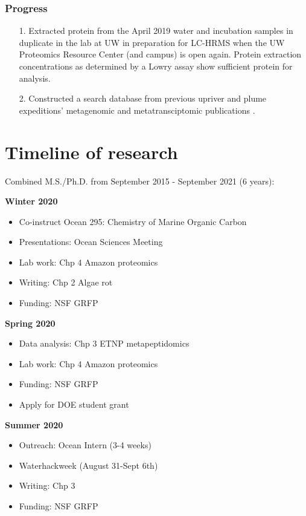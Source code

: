 \documentclass[12pt, letterpaper, twoside]{article}
\begin{document}
\subsubsection*{Progress}


\begin{enumerate}
	\item[1.] Extracted protein from the April 2019 water and incubation samples in duplicate in the lab at UW in preparation for LC-HRMS when the UW Proteomics Resource Center (and campus) is open again. Protein extraction concentrations as determined by a Lowry assay show sufficient protein for analysis. 
	\item[2.] Constructed a search database from previous upriver and plume expeditions' metagenomic and metatransciptomic publications \cite{satinsky_amazon_2014, doherty_bacterial_2017, satinsky_metagenomic_2015, ghai_metagenomics_2011}.
\end{enumerate}


\newpage

\section{Timeline of research}

Combined M.S./Ph.D. from September 2015 - September 2021 (6 years):

\bigskip

\textbf{Winter 2020}
\begin{itemize}
	\item Co-instruct Ocean 295: Chemistry of Marine Organic Carbon
	\item Presentations: Ocean Sciences Meeting
	\item Lab work: Chp 4 Amazon proteomics
	\item Writing: Chp 2 Algae rot
	\item Funding: NSF GRFP
\end{itemize}

\textbf{Spring 2020}
\begin{itemize}
	\item Data analysis: Chp 3 ETNP metapeptidomics
	\item Lab work: Chp 4 Amazon proteomics
	\item Funding: NSF GRFP
	\item Apply for DOE student grant
\end{itemize}

\textbf{Summer 2020}
\begin{itemize}
	\item Outreach: Ocean Intern (3-4 weeks)
	\item Waterhackweek (August 31-Sept 6th)
	\item Writing: Chp 3 
	\item Funding: NSF GRFP
\end{itemize}
\end{document}
